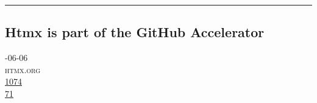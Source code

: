 \documentclass[10pt,a4paper]{article}
\begin{document}
\par\medskip
\noindent\textcolor{red}{\rule{\linewidth}{0.2mm}}

\subsection{Htmx is part of the GitHub Accelerator}
\noindent\begin{minipage}[t]{0.20\linewidth}
\vspace{0pt}
\noindent\textsc{\footnotesize
{\scriptsize\faCalendar}-06-06 \\
{\scriptsize\faGlobe}\space 
htmx.org \\
{\scriptsize\faThumbsOUp}\space 
\href{http://news.ycombinator.com/item?id=37144985\&utm\_term=comment}{1074} \\
{\scriptsize\faComments}\space 
\href{http://news.ycombinator.com/item?id=37144985\&utm\_term=comment}{71} \\
}
\end{minipage} %
\end{document}
